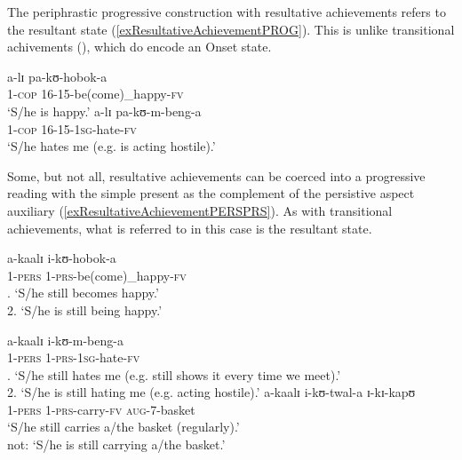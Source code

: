 The periphrastic progressive construction with resultative achievements refers to the resultant state (\ref{exResultativeAchievementPROG}). This is unlike transitional achivements (), which do encode an Onset state. 
\begin{exe}
\ex \label{exResultativeAchievementPROG}\begin{xlist}
\ex\gll a-lɪ pa-kʊ-hobok-a\\
1-\textsc{cop} 16-15-be(come)\_happy-\textsc{fv}\\
\glt `S/he is happy.'
\ex \gll a-lɪ pa-kʊ-m-beng-a\\
1-\textsc{cop} 16-15-\textsc{1sg}-hate-\textsc{fv}\\
\glt \lq S/he hates me (e.g. is acting hostile).'
\end{xlist}
\end{exe}

Some, but not all, resultative achievements can be coerced into a progressive reading with the simple present as the complement of the persistive aspect auxiliary (\ref{exResultativeAchievementPERSPRS}). As with transitional achievements, what is referred to in this case is the resultant state.

\begin{exe}
\ex \label{exResultativeAchievementPERSPRS}
\begin{xlist}
\ex\gll a-kaalɪ i-kʊ-hobok-a\\
1-\textsc{pers} 1-\textsc{prs}-be(come)\_happy-\textsc{fv}\\
. \lq S/he still becomes happy.'\\
2. \lq  S/he is still being happy.'

\ex\gll a-kaalɪ i-kʊ-m-beng-a\\
1-\textsc{pers} 1-\textsc{prs}-\textsc{1sg}-hate-\textsc{fv}\\
. \lq S/he still hates me (e.g. still shows it every time we meet).'\\
2. \lq  S/he is still hating me (e.g. acting hostile).'
\ex \gll a-kaalɪ i-kʊ-twal-a ɪ-kɪ-kapʊ\\
1-\textsc{pers} 1-\textsc{prs}-carry-\textsc{fv} \textsc{aug}-7-basket\\
\glt \lq S/he still carries a/the basket (regularly).'\\
not: \lq S/he is still carrying a/the basket.'
\end{xlist}
\end{exe}

